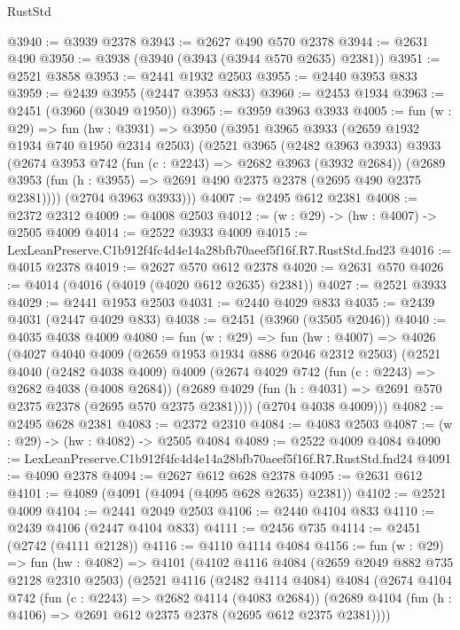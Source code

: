 \begin{lexlean}{RustStd}
\begin{coremodule}
@3940 := @3939 @2378
@3943 := @2627 @490 @570 @2378
@3944 := @2631 @490
@3950 := @3938 (@3940 (@3943 (@3944 @570 @2635) @2381))
@3951 := @2521 @3858
@3953 := @2441 @1932 @2503
@3955 := @2440 @3953 @833
@3959 := @2439 @3955 (@2447 @3953 @833)
@3960 := @2453 @1934
@3963 := @2451 (@3960 (@3049 @1950))
@3965 := @3959 @3963 @3933
@4005 := fun (w : @29) =>
  fun (hw : @3931) =>
  @3950
    (@3951
      @3965
      @3933
      (@2659 @1932 @1934 @740 @1950 @2314 @2503)
      (@2521
        @3965
        (@2482 @3963 @3933)
        @3933
        (@2674
          @3953
          @742
          (fun (c : @2243) => @2682 @3963 (@3932 @2684))
          (@2689 @3953 (fun (h : @3955) => @2691 @490 @2375 @2378 (@2695 @490 @2375 @2381))))
        (@2704 @3963 @3933)))
@4007 := @2495 @612 @2381
@4008 := @2372 @2312
@4009 := @4008 @2503
@4012 := (w : @29) -> (hw : @4007) -> @2505 @4009
@4014 := @2522 @3933 @4009
@4015 := LexLeanPreserve.C1b912f4fc4d4e14a28bfb70aeef5f16f.R7.RustStd.fnd23
@4016 := @4015 @2378
@4019 := @2627 @570 @612 @2378
@4020 := @2631 @570
@4026 := @4014 (@4016 (@4019 (@4020 @612 @2635) @2381))
@4027 := @2521 @3933
@4029 := @2441 @1953 @2503
@4031 := @2440 @4029 @833
@4035 := @2439 @4031 (@2447 @4029 @833)
@4038 := @2451 (@3960 (@3505 @2046))
@4040 := @4035 @4038 @4009
@4080 := fun (w : @29) =>
  fun (hw : @4007) =>
  @4026
    (@4027
      @4040
      @4009
      (@2659 @1953 @1934 @886 @2046 @2312 @2503)
      (@2521
        @4040
        (@2482 @4038 @4009)
        @4009
        (@2674
          @4029
          @742
          (fun (c : @2243) => @2682 @4038 (@4008 @2684))
          (@2689 @4029 (fun (h : @4031) => @2691 @570 @2375 @2378 (@2695 @570 @2375 @2381))))
        (@2704 @4038 @4009)))
@4082 := @2495 @628 @2381
@4083 := @2372 @2310
@4084 := @4083 @2503
@4087 := (w : @29) -> (hw : @4082) -> @2505 @4084
@4089 := @2522 @4009 @4084
@4090 := LexLeanPreserve.C1b912f4fc4d4e14a28bfb70aeef5f16f.R7.RustStd.fnd24
@4091 := @4090 @2378
@4094 := @2627 @612 @628 @2378
@4095 := @2631 @612
@4101 := @4089 (@4091 (@4094 (@4095 @628 @2635) @2381))
@4102 := @2521 @4009
@4104 := @2441 @2049 @2503
@4106 := @2440 @4104 @833
@4110 := @2439 @4106 (@2447 @4104 @833)
@4111 := @2456 @735
@4114 := @2451 (@2742 (@4111 @2128))
@4116 := @4110 @4114 @4084
@4156 := fun (w : @29) =>
  fun (hw : @4082) =>
  @4101
    (@4102
      @4116
      @4084
      (@2659 @2049 @882 @735 @2128 @2310 @2503)
      (@2521
        @4116
        (@2482 @4114 @4084)
        @4084
        (@2674
          @4104
          @742
          (fun (c : @2243) => @2682 @4114 (@4083 @2684))
          (@2689 @4104 (fun (h : @4106) => @2691 @612 @2375 @2378 (@2695 @612 @2375 @2381))))

\end{coremodule}
\end{lexlean}
